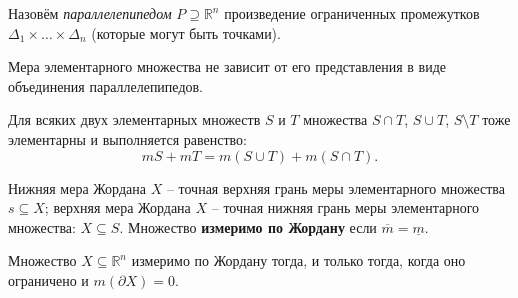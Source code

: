 
Назовём \textit{параллелепипедом} $P \supseteq \mathbb{R}^n$ произведение ограниченных промежутков $\Delta_1 \times \dots \times \Delta_n$ (которые могут быть точками). 

\begin{to_thr}
\label{cor42}
    Мера элементарного множества не зависит от его представления в виде объединения параллелепипедов. 
\end{to_thr}

\begin{to_thr}[\href{https://youtu.be/OlE7PruV6nY?list=PLocvKxfon41Xqv5Gamwh1aSSc9e97NET0&t=370}
{Аддитивность меры элементарных множеств}]
\label{add}
    Для всяких двух элементарных множеств $S$ и $T$ множества $S \cap T$, $S \cup T$, $S \setminus T$ тоже элементарны и выполняется равенство:
    $$
        mS + mT = m (S \cup T) + m (S \cap T).
    $$
\end{to_thr}

\begin{to_def}[\href{https://youtu.be/OlE7PruV6nY?list=PLocvKxfon41Xqv5Gamwh1aSSc9e97NET0&t=1032}
{Нижняя мера Жордана}]
    Нижняя мера Жордана $X$ -- точная верхняя грань меры элементарного множества $s \subseteq X$; верхняя мера Жордана $X$ -- точная нижняя грань меры элементарного множества: $X \subseteq S$. Множество \textbf{измеримо по Жордану} если $\overline{m} = \underline{m}$.
\end{to_def}

\begin{to_thr}
    Множество $X \subseteq \mathbb{R}^n$ измеримо по Жордану тогда, и только тогда, когда оно ограничено и $m(\partial X) = 0$.
\end{to_thr}


